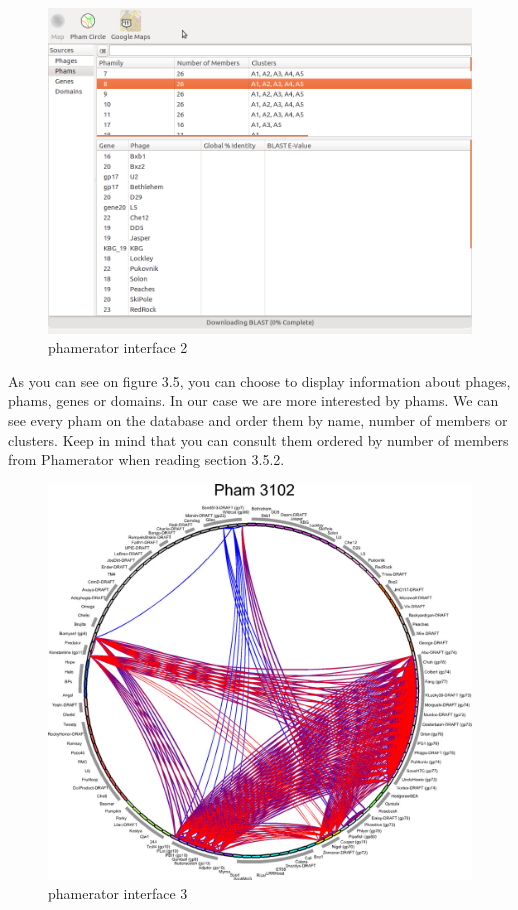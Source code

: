 \documentclass[a4paper,11pt]{report}
\begin{document}
\begin{figure}[H] 
	\begin{center}
		\includegraphics[scale=0.3]{img/phamerator_2}
		\caption{phamerator interface 2}
	\end{center}
\end{figure}

As you can see on figure 3.5, you can choose to display information about phages, phams, genes or domains. In our case we are more interested by phams. We can see every pham on the database and order them by name, number of members or clusters. Keep in mind that you can consult them ordered by number of members from Phamerator when reading section 3.5.2.

\begin{figure}[H] 
	\begin{center}
		\includegraphics[scale=0.45]{img/12859_2011_Article_4954_Fig8_HTML}
		\caption{phamerator interface 3}
	\end{center}
\end{figure}
\end{document}
